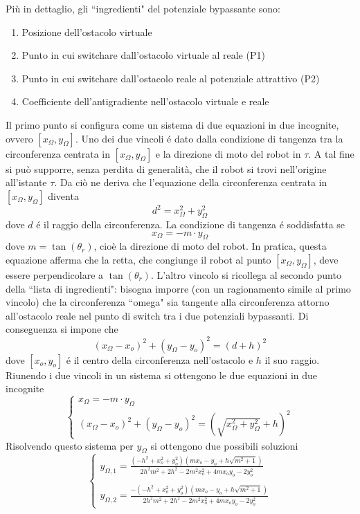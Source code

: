 \documentclass[14pt,a4paper]{extarticle}
\begin{document}
Più in dettaglio, gli ``ingredienti" del potenziale bypassante sono:
\begin{enumerate}
\item Posizione dell'ostacolo virtuale
\item Punto in cui switchare dall'ostacolo virtuale al reale (P1)
\item Punto in cui switchare dall'ostacolo reale al potenziale attrattivo (P2)
\item Coefficiente dell'antigradiente nell'ostacolo virtuale e reale
\end{enumerate}
Il primo punto si configura come un sistema di due equazioni in due incognite, ovvero \([x_{\Omega}, y_{\Omega}]\). Uno dei due vincoli é dato dalla condizione di tangenza tra la circonferenza centrata in  \([x_{\Omega}, y_{\Omega}]\) e la direzione di moto del robot in \(\tau\). A tal fine si può supporre, senza perdita di generalità, che il robot si trovi nell'origine all'istante \(\tau\). Da ciò ne deriva che l'equazione della circonferenza centrata in \([x_{\Omega}, y_{\Omega}]\) diventa \[d^2=x_{\Omega}^2+y_{\Omega}^2\] dove \(d\) é il raggio della circonferenza. La condizione di tangenza é soddisfatta se \[x_{\Omega} = -m\cdot  y_{\Omega}\] dove \(m = \tan(\theta_r)\), cioè la direzione di moto del robot. In pratica, questa equazione afferma che la retta, che congiunge il robot al punto \([x_{\Omega}, y_{\Omega}]\), deve essere perpendicolare a \(\tan(\theta_r)\). L'altro vincolo si ricollega al secondo punto della ``lista di ingredienti": bisogna imporre (con un ragionamento simile al primo vincolo) che la circonferenza ``omega" sia tangente alla circonferenza attorno all'ostacolo reale nel punto di switch tra i due potenziali bypassanti. Di conseguenza si impone che \[(x_{\Omega} - x_o)^2 + (y_{\Omega} - y_o)^2 = (d+h)^2\] dove \([x_o, y_o]\) é il centro della circonferenza nell'ostacolo e \(h\) il suo raggio. Riunendo i due vincoli in un sistema si ottengono le due equazioni in due incognite
\begin{equation}
\begin{cases}
x_{\Omega} = -m\cdot  y_{\Omega} \\
(x_{\Omega} - x_o)^2 + (y_{\Omega} - y_o)^2 = (\sqrt{x_{\Omega}^2+y_{\Omega}^2}+h)^2
\end{cases}
\end{equation}
Risolvendo questo sistema per \(y_{\Omega}\) si ottengono due possibili soluzioni
\begin{equation}
\label{yOmega}
\begin{cases}
y_{\Omega,1}=\frac{(-h^2 + x_o^2 + y_o^2)(m x_o - y_o + h\sqrt{m^2+1})}{2h^2m^2 + 2h^2 - 2m^2x_o^2 + 4mx_oy_o - 2y_o^2} \\\\
y_{\Omega,2}=\frac{-(-h^2 + x_o^2 + y_o^2)(m x_o - y_o + h\sqrt{m^2+1})}{2h^2m^2 + 2h^2 - 2m^2x_o^2 + 4mx_oy_o - 2y_o^2}
\end{cases}
\end{equation}
\end{document}

